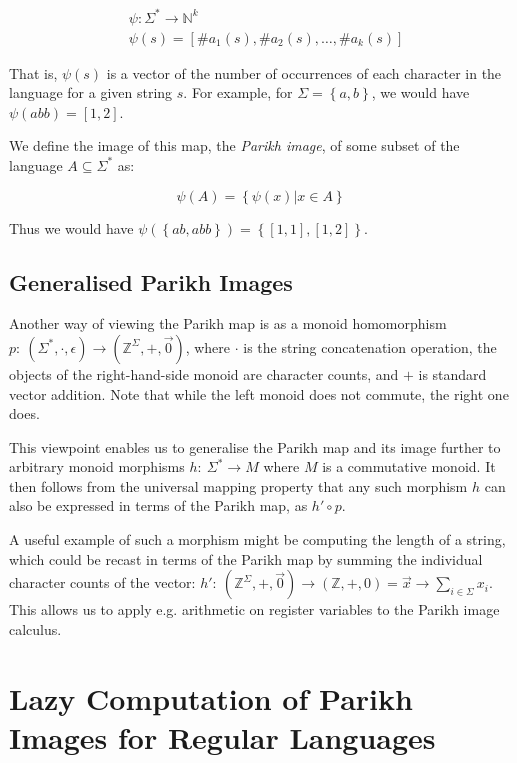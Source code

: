 \documentclass[runningheads]{llncs}
\begin{document}
$$
\begin{aligned}
& \psi: \Sigma^* \rightarrow \mathbb{N}^k \\
& \psi(s) = \left[\#a_1(s), \#a_2(s), \ldots, \#a_k(s)\right]
\end{aligned}
$$

That is, $\psi(s)$ is a vector of the number of occurrences of each character in the language for a given string $s$. For example, for  $\Sigma = \left \{ a, b\right\}$, we would have $\psi(abb) = \left[1, 2\right]$.

We define the image of this map, the \textit{Parikh image}, of some subset of the language $A \subseteq \Sigma^*$ as:

$$
\psi(A) = \left\{ \psi(x) | x \in A \right\}
$$

Thus we would have $\psi(\left\{ab, abb\right\}) = \left\{\left[1, 1\right], \left[1, 2\right]\right\}$.

\subsection{Generalised Parikh Images}\label{sec:generalised}

Another way of viewing the Parikh map is as a monoid homomorphism $p:\: \left(\Sigma^*, \cdot, \epsilon \right) \to (\mathbb{Z}^\Sigma, +, \vec{0})$, where $\cdot$ is the string concatenation operation, the objects of the right-hand-side monoid are character counts, and $+$ is standard vector addition. Note that while the left monoid does not commute, the right one does.

This viewpoint enables us to generalise the Parikh map and its image further to arbitrary monoid morphisms $h:\: \Sigma^* \to M$ where $M$ is a commutative monoid. It then follows from the universal mapping property that any such morphism $h$ can also be expressed in terms of the Parikh map, as $h' \circ p$.

A useful example of such a morphism might be computing the length of a string,
which could be recast in terms of the Parikh map by summing the individual
character counts of the vector: $h':\: (\mathbb{Z}^\Sigma, +, \vec{0}) \to
(\mathbb{Z}, +, 0) = \vec{x} \to \sum_{i \in \Sigma} x_i$. This allows us to
apply e.g. arithmetic on register variables to the Parikh image calculus.

\section{Lazy Computation of Parikh Images for Regular Languages}
\end{document}
